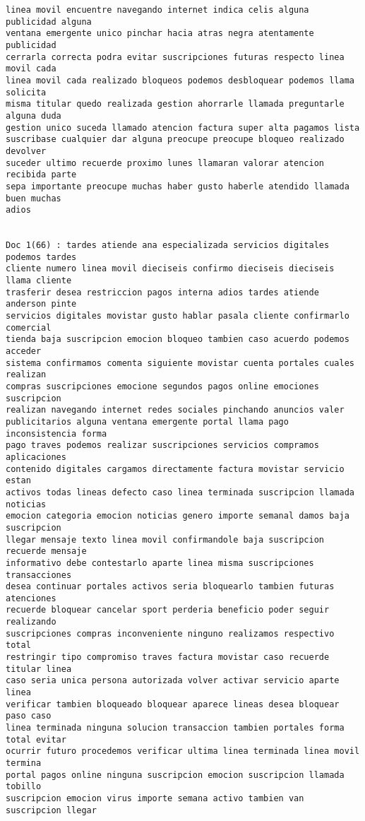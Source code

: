 \begin{Verbatim}[commandchars=\\\{\}]
linea movil encuentre navegando internet indica celis alguna publicidad alguna
ventana emergente unico pinchar hacia atras negra atentamente publicidad
cerrarla correcta podra evitar suscripciones futuras respecto linea movil cada
linea movil cada realizado bloqueos podemos desbloquear podemos llama solicita
misma titular quedo realizada gestion ahorrarle llamada preguntarle alguna duda
gestion unico suceda llamado atencion factura super alta pagamos lista
suscribase cualquier dar alguna preocupe preocupe bloqueo realizado devolver
suceder ultimo recuerde proximo lunes llamaran valorar atencion recibida parte
sepa importante preocupe muchas haber gusto haberle atendido llamada buen muchas
adios


Doc 1(66) : tardes atiende ana especializada servicios digitales podemos tardes
cliente numero linea movil dieciseis confirmo dieciseis dieciseis llama cliente
trasferir desea restriccion pagos interna adios tardes atiende anderson pinte
servicios digitales movistar gusto hablar pasala cliente confirmarlo comercial
tienda baja suscripcion emocion bloqueo tambien caso acuerdo podemos acceder
sistema confirmamos comenta siguiente movistar cuenta portales cuales realizan
compras suscripciones emocione segundos pagos online emociones suscripcion
realizan navegando internet redes sociales pinchando anuncios valer
publicitarios alguna ventana emergente portal llama pago inconsistencia forma
pago traves podemos realizar suscripciones servicios compramos aplicaciones
contenido digitales cargamos directamente factura movistar servicio estan
activos todas lineas defecto caso linea terminada suscripcion llamada noticias
emocion categoria emocion noticias genero importe semanal damos baja suscripcion
llegar mensaje texto linea movil confirmandole baja suscripcion recuerde mensaje
informativo debe contestarlo aparte linea misma suscripciones transacciones
desea continuar portales activos seria bloquearlo tambien futuras atenciones
recuerde bloquear cancelar sport perderia beneficio poder seguir realizando
suscripciones compras inconveniente ninguno realizamos respectivo total
restringir tipo compromiso traves factura movistar caso recuerde titular linea
caso seria unica persona autorizada volver activar servicio aparte linea
verificar tambien bloqueado bloquear aparece lineas desea bloquear paso caso
linea terminada ninguna solucion transaccion tambien portales forma total evitar
ocurrir futuro procedemos verificar ultima linea terminada linea movil termina
portal pagos online ninguna suscripcion emocion suscripcion llamada tobillo
suscripcion emocion virus importe semana activo tambien van suscripcion llegar

\end{Verbatim}
